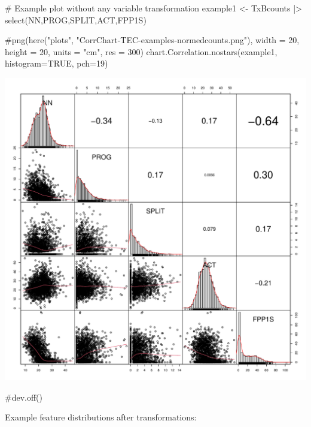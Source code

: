 \documentclass[
  letterpaper,
  DIV=11,
  numbers=noendperiod]{scrreprt}
\newenvironment{Shaded}{\begin{snugshade}}{\end{snugshade}}
\newcommand{\AttributeTok}[1]{\textcolor[rgb]{0.40,0.45,0.13}{#1}}
\newcommand{\CommentTok}[1]{\textcolor[rgb]{0.37,0.37,0.37}{#1}}
\newcommand{\ConstantTok}[1]{\textcolor[rgb]{0.56,0.35,0.01}{#1}}
\newcommand{\DecValTok}[1]{\textcolor[rgb]{0.68,0.00,0.00}{#1}}
\newcommand{\FunctionTok}[1]{\textcolor[rgb]{0.28,0.35,0.67}{#1}}
\newcommand{\NormalTok}[1]{\textcolor[rgb]{0.00,0.23,0.31}{#1}}
\newcommand{\OtherTok}[1]{\textcolor[rgb]{0.00,0.23,0.31}{#1}}
\newcommand{\SpecialCharTok}[1]{\textcolor[rgb]{0.37,0.37,0.37}{#1}}
\begin{document}
\begin{Shaded}
\begin{Highlighting}[]
\CommentTok{\# Example plot without any variable transformation}
\NormalTok{example1 }\OtherTok{\textless{}{-}}\NormalTok{ TxBcounts }\SpecialCharTok{|\textgreater{}} 
  \FunctionTok{select}\NormalTok{(NN,PROG,SPLIT,ACT,FPP1S)}

\CommentTok{\#png(here("plots", "CorrChart{-}TEC{-}examples{-}normedcounts.png"), width = 20, height = 20, units = "cm", res = 300)}
\FunctionTok{chart.Correlation.nostars}\NormalTok{(example1, }\AttributeTok{histogram=}\ConstantTok{TRUE}\NormalTok{, }\AttributeTok{pch=}\DecValTok{19}\NormalTok{)}
\end{Highlighting}
\end{Shaded}

\includegraphics{Ch6_data_prep_files/figure-pdf/example-correlation-plots-1.pdf}

\begin{Shaded}
\begin{Highlighting}[]
\CommentTok{\#dev.off()}
\end{Highlighting}
\end{Shaded}

Example feature distributions after transformations:
\end{document}
